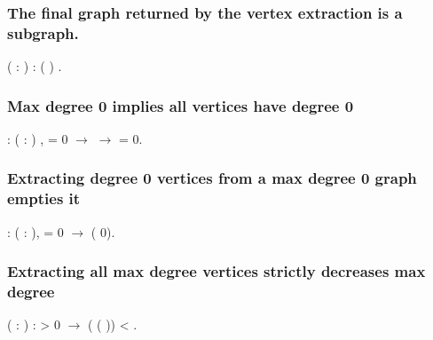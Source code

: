 \subsubsection{The final graph returned by the vertex extraction is a subgraph.}


\begin{coqdoccode}
\coqdocemptyline
\coqdocnoindent
{}  ( : )  :\coqdoceol
\coqdocindent{1.00em}
 (  ) .\coqdoceol
\coqdocemptyline
\end{coqdoccode}
\subsubsection{Max degree 0 implies all vertices have degree 0}


\begin{coqdoccode}
\coqdocemptyline
\coqdocnoindent
{}  : \coqdockw{\ensuremath{\forall}} ( : ) ,   = 0 \ensuremath{\rightarrow}    \ensuremath{\rightarrow}    =  0.\coqdoceol
\coqdocemptyline
\end{coqdoccode}
\subsubsection{Extracting degree 0 vertices from a max degree 0 graph empties it}


\begin{coqdoccode}
\coqdocemptyline
\coqdocnoindent
{}  : \coqdockw{\ensuremath{\forall}} ( : ),\coqdoceol
\coqdocindent{1.00em}
  = 0 \ensuremath{\rightarrow}  (  0).\coqdoceol
\coqdocemptyline
\end{coqdoccode}
\subsubsection{Extracting all max degree vertices strictly decreases max degree}


\begin{coqdoccode}
\coqdocemptyline
\coqdocnoindent
{}  ( : ) :\coqdoceol
\coqdocindent{1.50em}
  > 0 \ensuremath{\rightarrow}  (  ( )) <  .\coqdoceol
\coqdocemptyline
\end{coqdoccode}

